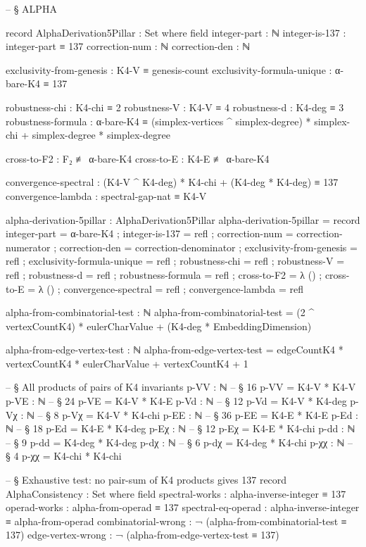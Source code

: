 \documentclass[11pt,a4paper]{book}
\begin{document}
\begin{code}
-- § ALPHA

record AlphaDerivation5Pillar : Set where
  field
    integer-part     : ℕ
    integer-is-137   : integer-part ≡ 137
    correction-num   : ℕ
    correction-den   : ℕ
    
    exclusivity-from-genesis : K4-V ≡ genesis-count
    exclusivity-formula-unique : α-bare-K4 ≡ 137
    
    robustness-chi : K4-chi ≡ 2
    robustness-V : K4-V ≡ 4
    robustness-d : K4-deg ≡ 3
    robustness-formula : α-bare-K4 ≡ (simplex-vertices ^ simplex-degree) * simplex-chi + simplex-degree * simplex-degree
    
    cross-to-F2 : F₂ ≢ α-bare-K4
    cross-to-E : K4-E ≢ α-bare-K4
    
    convergence-spectral : (K4-V ^ K4-deg) * K4-chi + (K4-deg * K4-deg) ≡ 137
    convergence-lambda : spectral-gap-nat ≡ K4-V

alpha-derivation-5pillar : AlphaDerivation5Pillar
alpha-derivation-5pillar = record
  { integer-part   = α-bare-K4
  ; integer-is-137 = refl
  ; correction-num = correction-numerator
  ; correction-den = correction-denominator
  ; exclusivity-from-genesis = refl
  ; exclusivity-formula-unique = refl
  ; robustness-chi = refl
  ; robustness-V = refl
  ; robustness-d = refl
  ; robustness-formula = refl
  ; cross-to-F2 = λ ()
  ; cross-to-E = λ ()
  ; convergence-spectral = refl
  ; convergence-lambda = refl
  }


alpha-from-combinatorial-test : ℕ
alpha-from-combinatorial-test = (2 ^ vertexCountK4) * eulerCharValue + (K4-deg * EmbeddingDimension)

alpha-from-edge-vertex-test : ℕ
alpha-from-edge-vertex-test = edgeCountK4 * vertexCountK4 * eulerCharValue + vertexCountK4 + 1

-- § All products of pairs of K4 invariants
p-VV : ℕ
-- § 16
p-VV = K4-V * K4-V
p-VE : ℕ
-- § 24
p-VE = K4-V * K4-E
p-Vd : ℕ
-- § 12
p-Vd = K4-V * K4-deg
p-Vχ : ℕ
-- § 8
p-Vχ = K4-V * K4-chi
p-EE : ℕ
-- § 36
p-EE = K4-E * K4-E
p-Ed : ℕ
-- § 18
p-Ed = K4-E * K4-deg
p-Eχ : ℕ
-- § 12
p-Eχ = K4-E * K4-chi
p-dd : ℕ
-- § 9
p-dd = K4-deg * K4-deg
p-dχ : ℕ
-- § 6
p-dχ = K4-deg * K4-chi
p-χχ : ℕ
-- § 4
p-χχ = K4-chi * K4-chi

-- § Exhaustive test: no pair-sum of K4 products gives 137
record AlphaConsistency : Set where
  field
    spectral-works     : alpha-inverse-integer ≡ 137
    operad-works       : alpha-from-operad ≡ 137
    spectral-eq-operad : alpha-inverse-integer ≡ alpha-from-operad
    combinatorial-wrong : ¬ (alpha-from-combinatorial-test ≡ 137)
    edge-vertex-wrong   : ¬ (alpha-from-edge-vertex-test ≡ 137)


\end{code}
\end{document}

